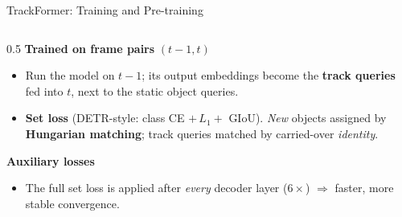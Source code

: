 \begin{frame}[fragile]{TrackFormer: Training and Pre-training}

  \begin{columns}[T]
    \begin{column}{0.5\textwidth}
      \textbf{Trained on frame pairs} $(t{-}1, t)$
      \begin{itemize}
        \item Run the model on $t{-}1$; its output embeddings become the \textbf{track queries} fed into $t$, next to the static object queries.
        \item \textbf{Set loss} (DETR-style: class CE $+\,L_1 +$ GIoU). \emph{New} objects assigned by \textbf{Hungarian matching}; track queries matched by carried-over \emph{identity}.
      \end{itemize}

      \vspace{0.3em}
      \textbf{Auxiliary losses}
      \begin{itemize}
        \item The full set loss is applied after \emph{every} decoder layer ($6\times$) $\Rightarrow$ faster, more stable convergence.
      \end{itemize}


\end{column}
\end{columns}
\end{frame}
